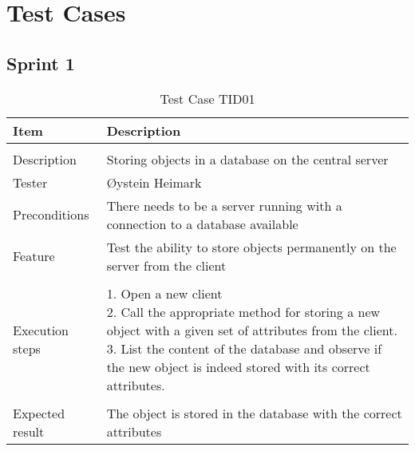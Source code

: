 \appendix



\clearpage


\chapter{Test Cases}
\section{Sprint 1}

\begin{table}
\caption{Test Case TID01}
\centering
\begin{tabular}{ l p{13cm} }
\hline 
 Item            & Description                                                              \\ 
\hline \\ [-2.0ex]
 Description     & Storing objects in a database on the central server                        \\ 
 Tester          & Øystein Heimark                  \\ 
 Preconditions   & There needs to be a server running with a connection to a database available \\ 
 Feature         & Test the ability to store objects permanently on the server from the client  \vspace{3pt}                     \\ 
\hline \\ [-1.5ex]
 Execution steps & \pbox{13cm}{1. Open a new client \\ 2. Call the appropriate method for storing a new object with a given set of attributes from the client. \\ 3. List the content of the database and observe if the new object is indeed stored with its correct attributes. } \vspace{3pt} \\
\hline \\ [-1.5ex]
 Expected result & The object is stored in the database with the correct attributes                                          \\
\hline 
\end{tabular}
\label{table:testcasetid01}
\end{table}



